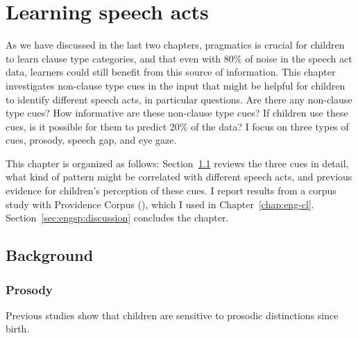\chapter{Learning speech acts}
\label{chap:eng-sp}
As we have discussed in the last two chapters, pragmatics is crucial for children to learn clause type categories, and that even with 80\% of noise in the speech act data, learners could still benefit from this source of information. This chapter investigates non-clause type cues in the input that might be helpful for children to identify different speech acts, in particular questions. Are there any non-clause type cues? How informative are these non-clause type cues? If children use these cues, is it possible for them to predict 20\% of the data? I focus on three types of cues, prosody, speech gap, and eye gaze. 

This chapter is organized as follows: Section~\ref{sec:engsp:background} reviews the three cues in detail, what kind of pattern might be correlated with different speech acts, and previous evidence for children's perception of these cues. I report results from a corpus study with Providence Corpus (\cite{ProvidenceCorpus}), which I used in Chapter~\ref{chap:eng-cl}. %
Section~\ref{sec:engsp:discussion} concludes the chapter.


\section{Background}
\label{sec:engsp:background}
\subsection{Prosody}
\label{sec:engsp:bg:prosody}

Previous studies show that children are sensitive to prosodic distinctions since birth. %


